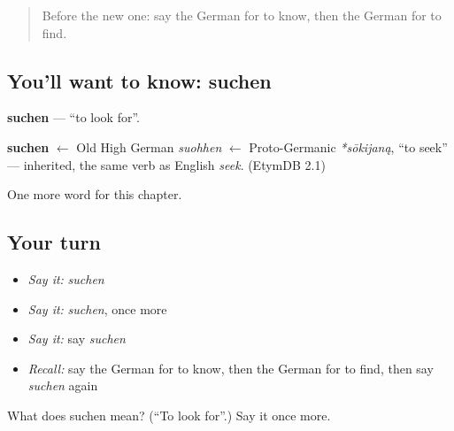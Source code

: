 \label{lesson:GE-C64-suchen}



\begin{quote}
Before the new one: say the German for to know, then the German for to find.
\end{quote}

\subsection*{You'll want to know: suchen}
\textbf{suchen} — \textquotedblleft{}to look for\textquotedblright{}.

\begin{cousinweb}
\textbf{suchen} $\leftarrow$ Old High German \emph{suohhen} $\leftarrow$ Proto-Germanic \emph{*sōkijaną}, \textquotedblleft{}to seek\textquotedblright{} — inherited, the same verb as English \emph{seek}. (EtymDB 2.1)
\end{cousinweb}

\begin{grammarlens}[title={What you've built}]
One more word for this chapter.
\end{grammarlens}

\subsection*{Your turn}
\begin{itemize}
\raggedright
  \item \emph{Say it:} \emph{suchen}
  \item \emph{Say it:} \emph{suchen}, once more
  \item \emph{Say it:} say \emph{suchen}
  \item \emph{Recall:} say the German for to know, then the German for to find, then say \emph{suchen} again
\end{itemize}

\begin{tcolorbox}[breakable,colback=teal!4,colframe=teal!35!black,title={Before you move on}]
What does suchen mean? (\textquotedblleft{}To look for\textquotedblright{}.) Say it once more.
\end{tcolorbox}
